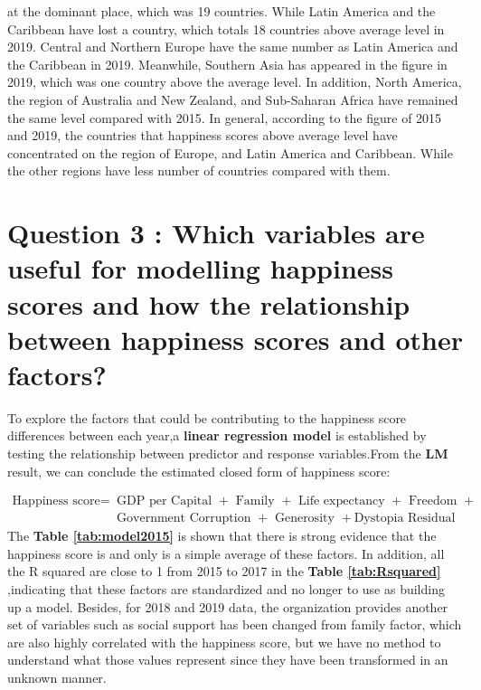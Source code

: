 \documentclass[11pt,a4paper,]{article}
\begin{document}
at the dominant place, which was 19 countries. While Latin America and the Caribbean have lost a country, which totals 18 countries above average level in 2019. Central and Northern Europe have the same number as Latin America and the Caribbean in 2019. Meanwhile, Southern Asia has appeared in the figure in 2019, which was one country above the average level. In addition, North America, the region of Australia and New Zealand, and Sub-Saharan Africa have remained the same level compared with 2015.
In general, according to the figure of 2015 and 2019, the countries that happiness scores above average level have concentrated on the region of Europe, and Latin America and Caribbean. While the other regions have less number of countries compared with them.

\clearpage

\hypertarget{question-3-which-variables-are-useful-for-modelling-happiness-scores-and-how-the-relationship-between-happiness-scores-and-other-factors}{%
\section{Question 3 : Which variables are useful for modelling happiness scores and how the relationship between happiness scores and other factors?}\label{question-3-which-variables-are-useful-for-modelling-happiness-scores-and-how-the-relationship-between-happiness-scores-and-other-factors}}

To explore the factors that could be contributing to the happiness score differences between each year,a \textbf{linear regression model} is established by testing the relationship between predictor and response variables.From the \textbf{LM} result, we can conclude the estimated closed form of happiness score:

\begin{align*}
\text{Happiness score} = & \text{ GDP per Capital } + \text{ Family } + \text{ Life expectancy }+ \text{ Freedom } +   \\ 
&  \text{ Government Corruption } + \text{ Generosity } + \text{Dystopia Residual }
\end{align*}
The \textbf{Table \ref{tab:model2015}} is shown that there is strong evidence that the happiness score is and only is a simple average of these factors. In addition, all the R squared are close to 1 from 2015 to 2017 in the \textbf{Table \ref{tab:Rsquared}} ,indicating that these factors are standardized and no longer to use as building up a model. Besides, for 2018 and 2019 data, the organization provides another set of variables such as social support has been changed from family factor, which are also highly correlated with the happiness score, but we have no method to understand what those values represent since they have been transformed in an unknown manner.
\end{document}
